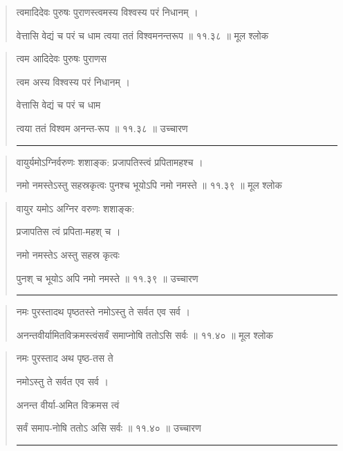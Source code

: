 \begin{quotation} 

त्वमादिदेवः पुरुषः पुराणस्त्वमस्य विश्वस्य परं निधानम्‌  ।  

वेत्तासि वेद्यं च परं च धाम त्वया ततं विश्वमनन्तरूप  ॥ ११.३८ ॥  मूल श्लोक
\end{quotation}

\begin{quotation}

त्वम आदिदेवः पुरुषः पुराणस   

त्वम अस्य विश्वस्य परं निधानम्‌  ।  

वेत्तासि वेद्यं च परं च धाम 

त्वया ततं विश्वम अनन्त-रूप  ॥ ११.३८ ॥  उच्चारण

\noindent\rule{16cm}{0.4pt} 
\end{quotation}


\begin{quotation} 

वायुर्यमोऽग्निर्वरुणः शशाङ्‍क: प्रजापतिस्त्वं प्रपितामहश्च ।  

नमो नमस्तेऽस्तु सहस्रकृत्वः पुनश्च भूयोऽपि नमो नमस्ते  ॥ ११.३९ ॥  मूल श्लोक
\end{quotation}

\begin{quotation}

वायुर यमोऽ अग्निर वरुणः शशाङ्‍क: 

प्रजापतिस त्वं प्रपिता-महश् च  ।  

नमो नमस्तेऽ अस्तु सहस्र कृत्वः 

पुनश् च भूयोऽ अपि नमो नमस्ते  ॥ ११.३९ ॥  उच्चारण

\noindent\rule{16cm}{0.4pt} 
\end{quotation}


\begin{quotation} 

नमः पुरस्तादथ पृष्ठतस्ते नमोऽस्तु ते सर्वत एव सर्व  ।  
 
अनन्तवीर्यामितविक्रमस्त्वंसर्वं समाप्नोषि ततोऽसि सर्वः  ॥ ११.४० ॥  मूल श्लोक
\end{quotation}

\begin{quotation}

नमः पुरस्ताद अथ पृष्ठ-तस ते 

नमोऽस्तु ते सर्वत एव सर्व ।  
 
अनन्त वीर्या-अमित विक्रमस त्वं 

सर्वं समाप-नोषि ततोऽ असि सर्वः  ॥ ११.४० ॥  उच्चारण

\noindent\rule{16cm}{0.4pt} 
\end{quotation}


